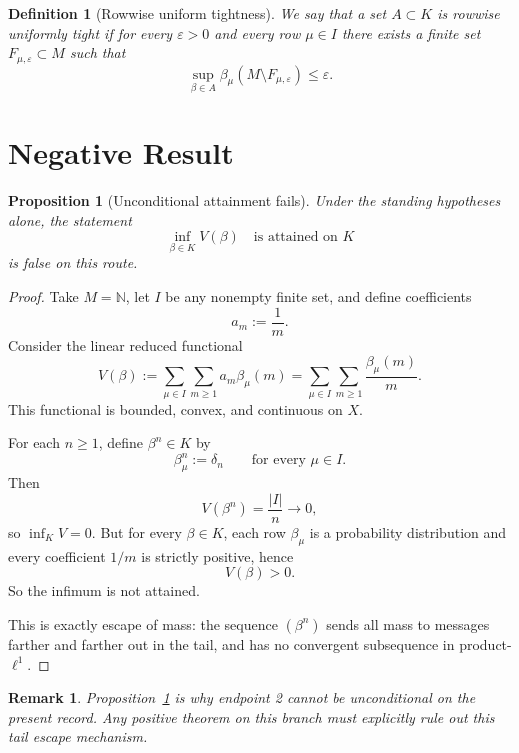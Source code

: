 \documentclass[12pt]{article}
\newtheorem{proposition}[theorem]{Proposition}
\newtheorem{remark}[theorem]{Remark}
\newtheorem{definition}[theorem]{Definition}
\newcommand{\N}{\mathbb{N}}
\begin{document}
\begin{definition}[Rowwise uniform tightness]
We say that a set $A \subset K$ is rowwise uniformly tight if for every $\varepsilon > 0$ and every row $\mu \in I$ there exists a finite set $F_{\mu,\varepsilon} \subset M$ such that
\[
\sup_{\beta \in A} \beta_\mu(M \setminus F_{\mu,\varepsilon}) \le \varepsilon .
\]
\end{definition}

\section{Negative Result}

\begin{proposition}[Unconditional attainment fails]
\label{prop:escape}
Under the standing hypotheses alone, the statement
\[
\inf_{\beta \in K} V(\beta)
\quad \text{is attained on } K
\]
is false on this route.
\end{proposition}

\begin{proof}
Take $M = \N$, let $I$ be any nonempty finite set, and define coefficients
\[
a_m := \frac{1}{m}.
\]
Consider the linear reduced functional
\[
V(\beta) := \sum_{\mu \in I} \sum_{m \ge 1} a_m \beta_\mu(m)
=
\sum_{\mu \in I} \sum_{m \ge 1} \frac{\beta_\mu(m)}{m}.
\]
This functional is bounded, convex, and continuous on $X$.

For each $n \ge 1$, define $\beta^n \in K$ by
\[
\beta^n_\mu := \delta_n
\qquad \text{for every } \mu \in I.
\]
Then
\[
V(\beta^n) = \frac{|I|}{n} \to 0,
\]
so $\inf_K V = 0$.
But for every $\beta \in K$, each row $\beta_\mu$ is a probability distribution and every coefficient $1/m$ is strictly positive, hence
\[
V(\beta) > 0.
\]
So the infimum is not attained.

This is exactly escape of mass: the sequence $(\beta^n)$ sends all mass to messages farther and farther out in the tail, and has no convergent subsequence in product-$\ell^1$.
\end{proof}

\begin{remark}
Proposition~\ref{prop:escape} is why endpoint 2 cannot be unconditional on the present record.
Any positive theorem on this branch must explicitly rule out this tail escape mechanism.
\end{remark}
\end{document}
